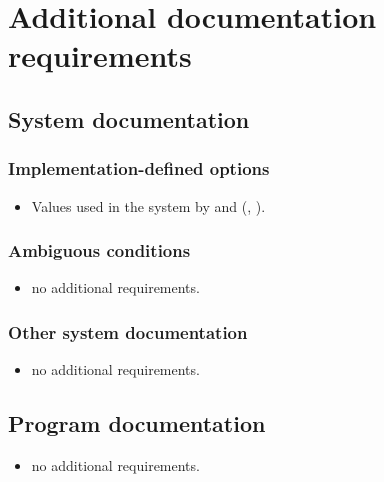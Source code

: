 \section{Additional documentation requirements} %

\subsection{System documentation} %

\subsubsection{Implementation-defined options} %
\begin{itemize}
\item Values used in the system by  and
	(,
	 ).
\end{itemize}

\subsubsection{Ambiguous conditions} %
\begin{itemize}
\item no additional requirements.
\end{itemize}

\subsubsection{Other system documentation} %
\begin{itemize}
\item no additional requirements.
\end{itemize}

\subsection{Program documentation} %
\begin{itemize}
\item no additional requirements.
\end{itemize}


